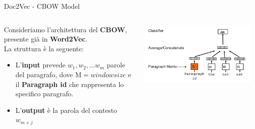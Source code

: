\documentclass[british]{beamer}
\begin{document}
\begin{frame}{Doc2Vec - CBOW Model}
	\begin{columns}
		\begin{column}{0.5\textwidth}
			Consideriamo l'architettura del \textbf{CBOW}, presente gi\`{a} in \textbf{Word2Vec}. \\
			La struttura \`{e} la seguente:
			\begin{itemize}
				\item L'\textbf{input} prevede $w_{1},w_{2},...w_{m}$ parole del paragrafo, dove $\mathrm{M} = window size$ e il \textbf{Paragraph id} che rappresenta lo specifico paragrafo.
				\item L'\textbf{output} \`{e} la parola del contesto $w_{m+j}$
			\end{itemize}
		\end{column}
		\begin{column}{0.65\linewidth}
			\includegraphics[width= \linewidth]{./Imgs/d2v-cbow.png}
		\end{column}
	\end{columns}
\end{frame}
\end{document}
